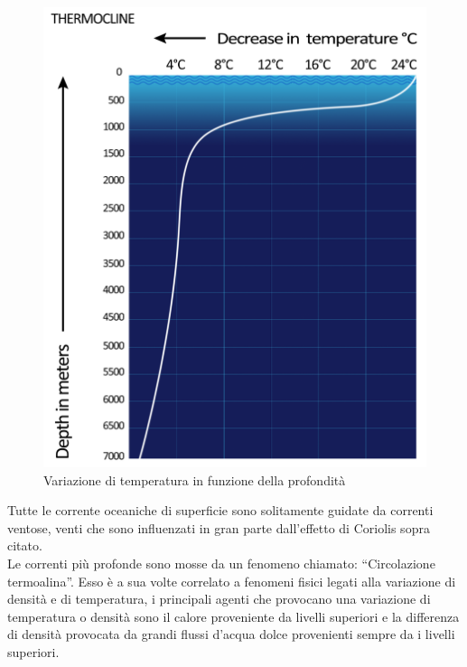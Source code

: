 \begin{figure}[H]
    \centering
    \includegraphics[height=0.4\textwidth]{res/cap2/termoclino}
    \caption{Variazione di temperatura in funzione della profondità}
\end{figure}\noindent
Tutte le corrente oceaniche di superficie sono solitamente guidate da correnti ventose, venti che sono influenzati in gran parte dall'effetto di Coriolis sopra citato.\\
Le correnti più profonde sono mosse da un fenomeno chiamato: \enquote{Circolazione termoalina}.
Esso è a sua volte correlato a fenomeni fisici legati alla variazione di densità e di temperatura, i principali agenti che provocano una variazione di temperatura o densità sono il calore proveniente da livelli superiori e la differenza di densità provocata da grandi flussi d'acqua dolce provenienti sempre da i livelli superiori.\\

